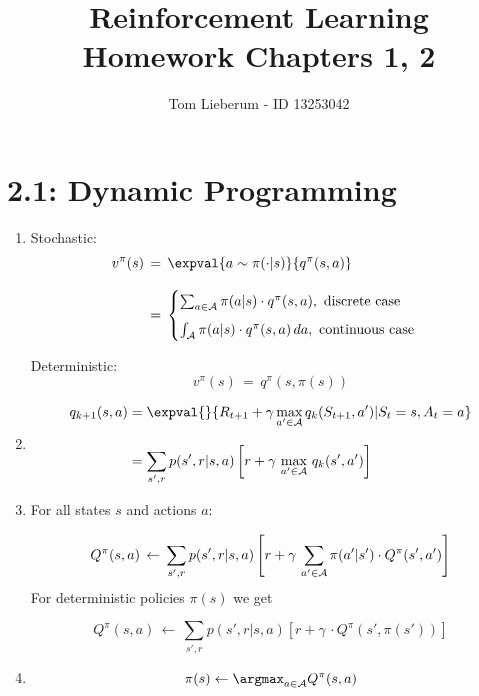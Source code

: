 \documentclass{article}
\title{Reinforcement Learning \\[3mm] Homework Chapters 1, 2}
\author{Tom Lieberum - ID 13253042}
\begin{document}
\date{}
\maketitle


\section*{2.1: Dynamic Programming}

\begin{enumerate}[label*=\arabic*.]

\item

Stochastic:
\begin{align*}
v^\pi(s) \,&=\, \expval{a\sim\pi(\cdot|s)}{q^\pi(s,a)}\\[3mm]
\,&=\, 
\begin{cases}
\sum_{a\in\cal A}\pi(a|s) \cdot q^\pi(s,a), \,\, \text{discrete case}\\[2mm]
\int_{\cal A}\pi(a|s) \cdot q^\pi(s,a) \,da, \,\, \text{continuous case}
\end{cases}
\end{align*}


\noindent Deterministic:
\[
v^\pi(s) \,=\,  q^\pi(s,\pi(s))
\]

\item
\begin{align*}
q_{k+1}(s,a) &= \expval{}{R_{t+1} + \gamma \max_{a'\in\cal A} {q_k(S_{t+1},a')} | S_t=s, A_t=a}\\[3mm]
&= \sum_{s',r} p(s',r|s,a)\left[ r + \gamma\, \max_{a' \in \cal A}\,q_{k}(s',a') \right]
\end{align*}


\item
For all states $s$ and actions $a$:

\[
Q^\pi(s,a) \,\leftarrow\, \sum_{s',r}p(s',r|s,a) \left[ r + \gamma\, \sum_{a'\in\cal A} \pi(a'|s')\cdot Q^\pi(s',a') \right]
\]
For deterministic policies $\pi(s)$ we get

\[
Q^\pi(s,a) \,\leftarrow\, \sum_{s',r}p(s',r|s,a) \left[ r + \gamma\, \cdot Q^\pi(s',\pi(s')) \right]
\]

\item
\[
\pi(s) \leftarrow \argmax_{a\in \cal A}Q^{\pi}(s,a)
\]

\end{enumerate}
\end{document}
